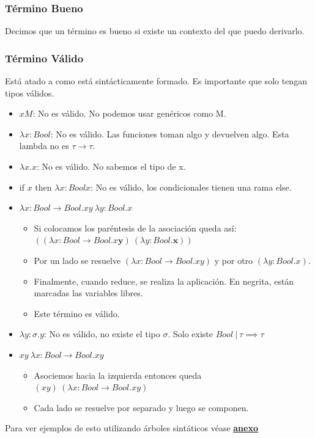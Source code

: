\documentclass[10pt,a4paper]{article}
\begin{document}
\subsubsection{Término Bueno}
Decimos que un término es bueno si existe un contexto del que puedo derivarlo. 
\subsubsection{Término Válido}
Está atado a como está sintácticamente formado. Es importante que solo tengan tipos válidos.
\begin{itemize}
    \item $x M$: No es válido. No podemos usar genéricos como M.
    \item $\lambda x:Bool$: No es válido. Las funciones toman algo y devuelven algo. Esta lambda no es $\tau \rightarrow \tau$.
    \item $\lambda x.x$: No es válido. No sabemos el tipo de x.
    \item if $x$ then $\lambda x:Bool x$: No es válido, los condicionales tienen una rama else.
    \item $\lambda x: Bool \rightarrow Bool . xy \ \lambda y: Bool . x$
    \begin{itemize}
        \item Si colocamos los paréntesis de la asociación queda así: $((\lambda x: Bool \rightarrow Bool . x \textbf{y}) \ (\lambda y: Bool . \textbf{x}))$
        \item Por un lado se resuelve $(\lambda x: Bool \rightarrow Bool . xy)$ y por otro $(\lambda y: Bool . x)$.
        \item Finalmente, cuando reduce, se realiza la aplicación. En negrita, están marcadas las variables libres.
        \item Este término es válido.
    \end{itemize}
    \item $\lambda y:\sigma . y$: No es válido, no existe el tipo $\sigma$. Solo existe $Bool \ | \ \tau \implies \tau$
    \item $xy \ \lambda x: Bool \rightarrow Bool . xy$
    \begin{itemize}
        \item Asociemos hacia la izquierda entonces queda $(xy) \ (\lambda x: Bool \rightarrow Bool . xy)$
        \item Cada lado se resuelve por separado y luego se componen.
    \end{itemize}
\end{itemize}
Para ver ejemplos de esto utilizando árboles sintáticos véase \hyperref[subsec:arbol_sintatico]{\textbf{\underline{anexo}}}
\end{document}
